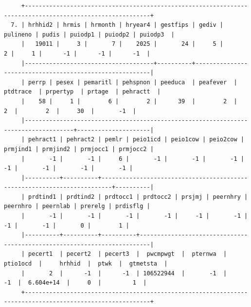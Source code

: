 \documentclass[
]{book}
\begin{document}
\begin{verbatim}
     +----------------------------------------------------------------------------------------------------------+
  7. | hrhhid2 | hrmis | hrmonth | hryear4 | gestfips | gediv | pulineno | pudis | puiodp1 | puiodp2 | puiodp3  |
     |   19011 |     3 |       7 |    2025 |       24 |     5 |        2 |     1 |      -1 |      -1 |      -1  |
     |-------------------------------------+----------+---------------------------------------------------------|
     | perrp | pesex | pemaritl | pehspnon | peeduca  | peafever  | ptdtrace  | prpertyp  | prtage  | pehractt  |
     |    58 |     1 |        6 |        2 |      39  |        2  |        2  |        2  |     30  |       -1  |
     |------------------------------------------------------------------------------------+---------------------|
     | pehract1 | pehract2 | pemlr | peio1icd | peio1cow | peio2cow | prmjind1 | prmjind2 | prmjocc1 | prmjocc2 |
     |       -1 |       -1 |     6 |       -1 |       -1 |       -1 |       -1 |       -1 |       -1 |       -1 |
     |----------+----------+-------------------------------------------------------------------------+----------|
     | prdtind1 | prdtind2 | prdtocc1 | prdtocc2 | prsjmj | peernhry | peernhro | peernlab | prerelg | prdisflg |
     |       -1 |       -1 |       -1 |       -1 |     -1 |       -1 |       -1 |       -1 |       0 |        1 |
     |----------+----------+----------+-------------------------------------------------------------------------|
     | pecert1  | pecert2  | pecert3  |  pwcmpwgt  |  pternwa  |  ptio1ocd  |     hrhhid  |  ptwk  |  gtmetsta  |
     |       2  |      -1  |      -1  | 106522944  |       -1  |        -1  |  6.604e+14  |     0  |         1  |
     +----------------------------------------------------------------------------------------------------------+


\end{verbatim}
\end{document}
